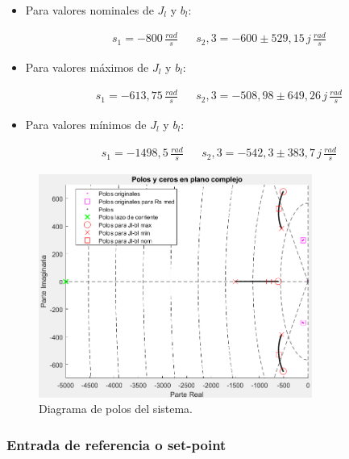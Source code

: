 \documentclass{article}
\begin{document}
\begin{itemize}
    \item Para valores nominales de $J_l$ y $b_l$:
    
    \begin{align*}
        s_1 = -800\, \frac{rad}{s} & & s_2,3  = -600 \pm 529,15\, j \, \frac{rad}{s} 
    \end{align*}
    
    \item Para valores máximos de $J_l$ y $b_l$:
    
    \begin{align*}
        s_1 = -613,75\, \frac{rad}{s} & & s_2,3  = -508,98 \pm 649,26\, j \, \frac{rad}{s} 
    \end{align*}

    \item Para valores mínimos de $J_l$ y $b_l$:
    
    \begin{align*}
        s_1 = -1498,5\, \frac{rad}{s} & & s_2,3  = -542,3 \pm 383,7\, j \, \frac{rad}{s} 
    \end{align*}

\end{itemize}

\begin{figure}[H]
    \centering
    \includegraphics[width=0.8\textwidth]{polos.png}
    \caption{Diagrama de polos del sistema.}
\end{figure}


\subsubsection{Entrada de referencia o set-point}
\end{document}
